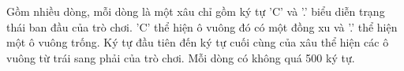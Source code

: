 Gồm nhiều dòng, mỗi dòng là một xâu chỉ gồm ký tự 'C' và '.' biểu diễn trạng thái ban đầu của trò chơi. 'C' thể hiện ô vuông đó có một đồng xu và '.' thể hiện một ô vuông trống. Ký tự đầu tiên đến ký tự cuối cùng của xâu thể hiện các ô vuông từ trái sang phải của trò chơi. Mỗi dòng có không quá 500 ký tự.

\
